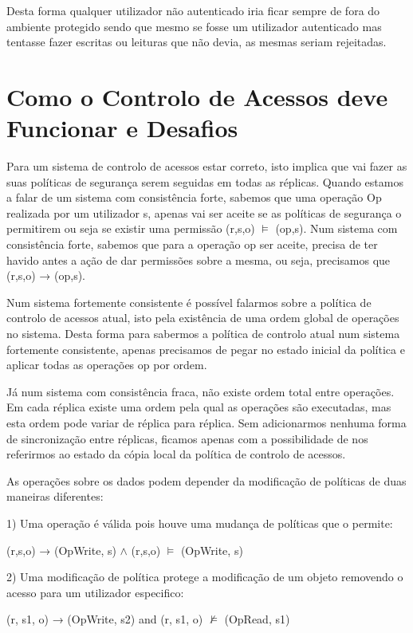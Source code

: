 \documentclass[runningheads,a4paper]{llncs}
\begin{document}
Desta forma qualquer utilizador não autenticado iria ficar sempre de fora do ambiente protegido sendo que mesmo se fosse um utilizador autenticado mas tentasse fazer escritas ou leituras que não devia, as mesmas seriam rejeitadas.

\section{Como o Controlo de Acessos deve Funcionar e Desafios}\label{sec:challenges}

Para um sistema de controlo de acessos estar correto, isto implica que vai fazer as suas políticas de segurança serem seguidas em todas as réplicas. Quando estamos a falar de um sistema com consistência forte, sabemos que uma operação Op realizada por um utilizador s, apenas vai ser aceite se as políticas de segurança o permitirem ou seja se existir uma permissão (r,s,o) $\models$ (op,s). Num sistema com consistência forte, sabemos que para a operação op ser aceite, precisa de ter havido antes a ação de dar permissões sobre a mesma, ou seja, precisamos que (r,s,o) → (op,s). 

Num sistema fortemente consistente é possível falarmos sobre a política de controlo de acessos atual, isto pela existência de uma ordem global de operações no sistema. Desta forma para sabermos a política de controlo atual num sistema fortemente consistente, apenas precisamos de pegar no estado inicial da política e aplicar todas as operações op por ordem.

Já num sistema com consistência fraca, não existe ordem total entre operações. Em cada réplica existe uma ordem pela qual as operações são executadas, mas esta ordem pode variar de réplica para réplica. Sem adicionarmos nenhuma forma de sincronização entre réplicas, ficamos apenas com a possibilidade de nos referirmos ao estado da cópia local da política de controlo de acessos.

As operações sobre os dados podem depender da modificação de políticas de duas maneiras diferentes:

1) Uma operação é válida pois houve uma mudança de políticas que o permite:
\\
\begin{center}
(r,s,o) → (OpWrite, s) $\wedge$ (r,s,o) $\models$ (OpWrite, s)
\end{center}
2) Uma modificação de política protege a modificação de um objeto removendo o acesso para um utilizador especifico:
\\
\begin{center}
(r, s1, o) → (OpWrite, s2) and (r, s1, o) $\not\models$ (OpRead, s1)
\end{center}
\end{document}
